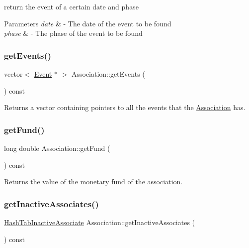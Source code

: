 return the event of a certain date and phase 


\begin{DoxyParams}{Parameters}
{\em date} & -\/ The date of the event to be found \\
\hline
{\em phase} & -\/ The phase of the event to be found \\
\hline
\end{DoxyParams}
\mbox{\label{classAssociation_a3deb177639e3c8042f7400f336fdda08}} 
\subsubsection{\texorpdfstring{get\+Events()}{getEvents()}}
{\footnotesize\ttfamily vector$<$ \mbox{\hyperlink{classEvent}{Event}} $\ast$ $>$ Association\+::get\+Events (\begin{DoxyParamCaption}{ }\end{DoxyParamCaption}) const}



Returns a vector containing pointers to all the events that the \mbox{\hyperlink{classAssociation}{Association}} has. 

\mbox{\label{classAssociation_a4834d8fe0057ca4c55fa3e83bc47aae5}} 
\subsubsection{\texorpdfstring{get\+Fund()}{getFund()}}
{\footnotesize\ttfamily long double Association\+::get\+Fund (\begin{DoxyParamCaption}{ }\end{DoxyParamCaption}) const}



Returns the value of the monetary fund of the association. 

\mbox{\label{classAssociation_a8f80d4cad7e99335683d3de0b44a0a00}} 
\subsubsection{\texorpdfstring{get\+Inactive\+Associates()}{getInactiveAssociates()}}
{\footnotesize\ttfamily \mbox{\hyperlink{Association_8h_a867982abd2e9432d5bed2574754bad3c}{Hash\+Tab\+Inactive\+Associate}} Association\+::get\+Inactive\+Associates (\begin{DoxyParamCaption}{ }\end{DoxyParamCaption}) const}



